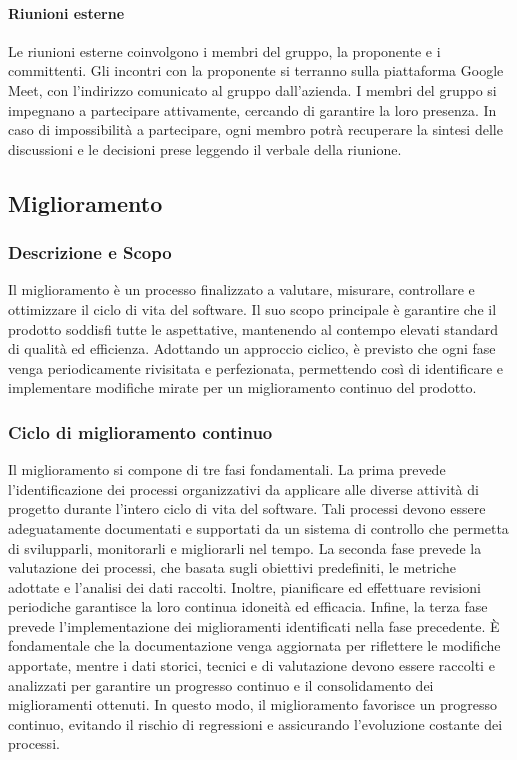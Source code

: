 \documentclass[10pt]{article}
\begin{document}
\begin{justify}
        \paragraph{Riunioni esterne}
        Le riunioni esterne coinvolgono i membri del gruppo, la proponente e i committenti. Gli incontri con la proponente si terranno sulla piattaforma Google Meet, con l'indirizzo comunicato al gruppo dall'azienda. I membri del gruppo si impegnano a partecipare attivamente, cercando di garantire la loro presenza. In caso di impossibilità a partecipare, ogni membro potrà recuperare la sintesi delle discussioni e le decisioni prese leggendo il verbale della riunione.

    \subsection{Miglioramento}
    \label{miglioramento}
    \subsubsection{Descrizione e Scopo}
    Il miglioramento è un processo finalizzato a valutare, misurare, controllare e ottimizzare il ciclo di vita del software. Il suo scopo principale è garantire che il prodotto soddisfi tutte le aspettative, mantenendo al contempo elevati standard di qualità ed efficienza.
    Adottando un approccio ciclico, è previsto che ogni fase venga periodicamente rivisitata e perfezionata, permettendo così di identificare e implementare modifiche mirate per un miglioramento continuo del prodotto.\\ 

    \subsubsection{Ciclo di miglioramento continuo}
    Il miglioramento si compone di tre fasi fondamentali. La prima prevede l’identificazione dei processi organizzativi da applicare alle diverse attività di progetto durante l’intero ciclo di vita del software. Tali processi devono essere adeguatamente documentati e supportati da un sistema di controllo che permetta di svilupparli, monitorarli e migliorarli nel tempo. La seconda fase prevede la valutazione dei processi, che basata sugli obiettivi predefiniti, le metriche adottate e l’analisi dei dati raccolti. Inoltre, pianificare ed effettuare revisioni periodiche garantisce la loro continua idoneità ed efficacia.
    Infine, la terza fase prevede l'implementazione dei miglioramenti identificati nella fase precedente. È fondamentale che la documentazione venga aggiornata per riflettere le modifiche apportate, mentre i dati storici, tecnici e di valutazione devono essere raccolti e analizzati per garantire un progresso continuo e il consolidamento dei miglioramenti ottenuti. In questo modo, il miglioramento favorisce un progresso continuo, evitando il rischio di regressioni e assicurando l'evoluzione costante dei processi.


\end{justify}
\end{document}
